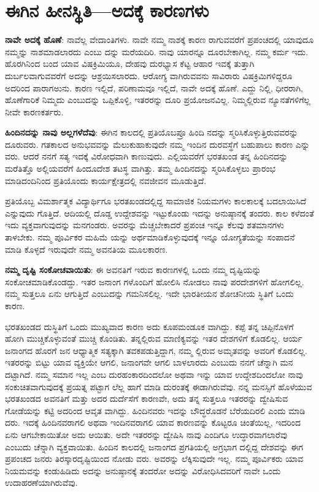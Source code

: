 
\chapter{ಈಗಿನ ಹೀನಸ್ಥಿತಿ—ಅದಕ್ಕೆ ಕಾರಣಗಳು}

\textbf{ನಾವೇ ಅದಕ್ಕೆ ಹೊಣೆ}: ನಾವೆಲ್ಲ ವೇದಾಂತಿಗಳು. ನಾವೇ ನಮ್ಮ ನಾಶಕ್ಕೆ ಕಾರಣ ರಾಗುವವರೆಗೆ ಪ್ರಪಂಚದಲ್ಲಿ ಯಾವುದೂ ನಮ್ಮನ್ನು ನಾಶಮಾಡಲಾರದು ಎಂಬು ದನ್ನು ಮರೆಯದಿರಿ. ನಾವು ಯಾರನ್ನೂ ದೂರಬೇಕಾಗಿಲ್ಲ. ನಮ್ಮ ಕರ್ಮ ಇದು. ಹೊರಗಿನಿಂದ ಬಂದ ಯಾವ ವಿಷಕ್ರಿಮಿಯೂ, ದೇಹವು ದುರಭ್ಯಾಸ ಕೆಟ್ಟ ಆಹಾರ ಇವಕ್ಕೆ ತುತ್ತಾಗಿ ದುರ್ಬಲವಾಗುವವರೆಗೆ ಅದನ್ನು ಆಶ್ರಯಿಸಲಾರದು. ಆರೋಗ್ಯ ವಾಗಿರುವವನು ಸಾವಿರಾರು ವಿಷಕ್ರಿಮಿಗಳಿದ್ದರೂ ಅದರಿಂದ ಪಾರಾಗಅುನು. ಕಾರಣ ಇಲ್ಲಿದೆ, ಪರಿಣಾಮವೂ ಇಲ್ಲಿದೆ, ನಾವೇ ಅದಕ್ಕೆ ಹೊಣೆ. ಎದ್ದು ನಿಲ್ಲಿ, ಧೀರರಾಗಿ, ಹೊಣೆಗಾರಿಕೆ ನಿಮ್ಮದು ಎಂಬುದನ್ನು ಒಪ್ಪಿಕೊಳ್ಳಿ, ಇತರರನ್ನು ದೂರಿ ಪ್ರಯೋಜನವಿಲ್ಲ. ನಿಮ್ಮಲ್ಲಿರುವ ನ್ಯೂನತೆಗಳಿಗೆಲ್ಲ ನೀವೇ ಕಾರಣಕರ್ತರು.

\textbf{ಹಿಂದಿನದನ್ನು ನಾವು ಅಲ್ಲಗಳೆದೆವು}: ಈಗಿನ ಕಾಲದಲ್ಲಿ ಪ್ರತಿಯೊಬಪ್ರೂ ಹಿಂದಿ ನದನ್ನು ಸ್ಮರಿಸಿಕೊಳ್ಳುತ್ತಿರುವವರನ್ನು ದೂರುವರು. ಗತಕಾಲದ ಅನುಭವವನ್ನು ಮೆಲುಕುಹಾಕುವುದೇ ನಮ್ಮ ಇಂದಿನ ದುರವಸ್ಥೆಗೆ ಬಹುಪಾಲು ಕಾರಣ ಎನ್ನು ವರು. ಆದರೆ ನನಗೆ ಸತ್ಯ ಇದಕ್ಕೆ ವಿರೋಧವಾಗಿ ಕಾಣುವುದು. ಎಲ್ಲಿಯವರೆಗೆ ಭರತಖಂಡ ತನ್ನ ಹಿಂದಿನದನ್ನು ಮರೆತಿತ್ತೊ ಅಲ್ಲಿಯವರೆಗೆ ಹಿಂದೂದೇಶ ತಟಸ್ಥ ವಾಗಿತ್ತು. ತಮ್ಮ ಹಿಂದಿನದನ್ನು ಸ್ಮರಿಸಿಕೊಳ್ಳಲು ಪ್ರಾರಂಭ ಮಾಡಿದಂದಿನಿಂದ ಪ್ರತಿಯೊಂದು ಕಾರ್ಯಕ್ಷೇತ್ರದಲ್ಲಿ ನವಜೀವನ ಮೂಡುತ್ತಿದೆ.

ಪ್ರತಿಯೊಬ್ಬ ವಿಮರ್ಶಾತ್ಮಕ ವಿದ್ಯಾರ್ಥಿಗೂ ಭರತಖಂಡದಲ್ಲಿದ್ದ ಸಾಮಾಜಿಕ ನಿಯಮಗಳು ಕಾಲಕಾಲಕ್ಕೆ ಬದಲಾಯಿಸಿದೆ ಎನ್ನುವುದು ಗೊತ್ತಿದೆ. ಆದಿಯಲ್ಲಿ ದೊಡ್ಡ ಉದ್ದೇಶವನ್ನು ಇಟ್ಟುಕೊಂಡು ಇದನ್ನು ಅನುಷ್ಠಾನಕ್ಕೆ ತಂದರು. ಕಾಲ ಕಳೆದಂತೆ ಇದು ವ್ಯಕ್ತವಾಗುವುದನ್ನು ಮನಗಂಡರು. ಅವರನ್ನು ಮೆಚ್ಚಬೇಕಾದರೆ ಪ್ರಪಂಚ ಇನ್ನೂ ಕೆಲವು ಶತಮಾನಗಳು ತಾಳಬೇಕು. ನಮ್ಮ ಪೂರ್ವಿಕರ ಮಹಿಮೆ ಯನ್ನು ಅರ್ಥಮಾಡಿಕೊಳ್ಳುವುದಕ್ಕೆ ಇನ್ನೂ ಯೋಗ್ಯತೆಯನ್ನು ಸಂಪಾದನೆ ಮಾಡಿ ಕೊಳ್ಳದೆ ಇರುವುದೇ ನಮ್ಮ ಅವನತಿಯ ಮೂಲಕಾರಣ.

\textbf{ನಮ್ಮ ದೃಷ್ಟಿ ಸಂಕೋಚವಾಯಿತು}: ಈ ಅವನತಿಗೆ ಇರುವ ಕಾರಣಗಳಲ್ಲಿ ಒಂದು ನಮ್ಮ ದೃಷ್ಟಿಯನ್ನು ಸಂಕೋಚಮಾಡಿಕೊಂಡದ್ದು. ಇತರ ಜನಾಂಗ ಗಳೊಂದಿಗೆ ಹೋಲಿಸಿ ನೋಡಲು ನಾವು ಪರದೇಶಗಳಿಗೆ ಹೋಗಲಿಲ್ಲ. ನಮ್ಮ ಸುತ್ತಲೂ ಏನು ಆಗುತ್ತಿದೆ ಎಂಬುದನ್ನು ಗಮನಿಸಲಿಲ್ಲ. ಇದೇ ಭಾರತೀಯನ ಶೋಚನೀಯ ಸ್ಥಿತಿಗೆ ಒಂದು ಕಾರಣ.

ಭರತಖಂಡದ ದುಸ್ಥಿತಿಗೆ ಒಂದು ಮುಖ್ಯವಾದ ಕಾರಣ ಅದು ಕೂಪಮಂಡೂಕ ವಾಗಿದ್ದು. ಕಪ್ಪೆ ತನ್ನ ಚಿಪ್ಪಿನೊಳಗೆ ಹೋಗಿ ಮುಚ್ಚಿಕೊಳ್ಳುವಂತೆ ಮುಚ್ಚಿ ಕೊಂಡಿತು. ತನ್ನಲ್ಲಿರುವ ಮಾಣಿಕ್ಯವನ್ನು ಇತರ ದೇಶಗಳಿಗೆ ಕೊಡಲಿಲ್ಲ. ಆರ್ಯ ಜನಾಂಗದ ಹೊರಗೆ ಜನ ಆಧ್ಯಾತ್ಮಿಕ ಸತ್ಯಕ್ಕಾಗಿ ತವಕಪಡುತ್ತಿದ್ದಾಗ, ನಮ್ಮ ಲ್ಲಿರುವ ಅಮೃತವನ್ನು ಅವರಿಗೆ ಕೊಡಲಿಲ್ಲ. ಇತರರನ್ನು ಬಿಟ್ಟು ಯಾವ ವ್ಯಕ್ತಿಯೇ ಆಗಲಿ, ಜನಾಂಗವೇ ಆಗಲಿ ಬಾಳಲಾರದು ಎಂಬುದು ನನಗೆ ಚೆನ್ನಾಗಿ ಮನ ದಟ್ಟಾಗಿದೆ. ನಮ್ಮ ಸಮಾನ ಇಲ್ಲ ಎಂಬ ದುರಹಂಕಾರದಿಂದಲೋ ಅಥವಾ ಇನ್ನು ಯಾವ ಉದ್ದೇಶದಿಂದಲೋ ನಾವು ಸಂಕುಚಿತವಾಗುವುದಕ್ಕೆ ಪ್ರಯತ್ನ ಪಟ್ಟಾಗ ಲೆಲ್ಲ ಹಾಗೆ ಮಾಡಿ ದುರಂತಕ್ಕೆ ಈಡಾಗಿರುವೆವು. ನನ್ನ ಮನಸ್ಸಿಗೆ ಹೊಳೆಯುವ ಭರತಖಂಡದ ಅವನತಿಗೆ ಮತ್ತು ಅದರ ದುರ್ದೆಸೆಗೆ ಕಾರಣವೇ, ಅದು ತನ್ನ ಸುತ್ತಲೂ ಇತರರನ್ನು ದ್ವೇಷಿಸುವ ಗೋಡೆಯನ್ನು ಕಟ್ಟಿ ಅದರಿಂದ ಆವೃತ ವಾಗಿದ್ದು. ಹಿಂದಿನವರು ಇದನ್ನು ಬೌದ್ಧರೊಡನೆ ಬೆರೆಯದಿರಲಿ ಎಂದು ಮಾಡಿ ದರು. ಇದಕ್ಕೆ ಹಿಂದಿನವರಾಗಲಿ ಅಥವಾ ಇಂದಿನವರಾಗಲಿ ಯಾವ ಕಾರಣವನ್ನು ಕೊಟ್ಟರೂ ಚಿಂತೆಯಿಲ್ಲ, ಇದರಿಂದ ಏನು ಆಗಬೇಕಾಯಿತೋ ಅದು ಆಯಿತು. ಅದೇ ಇತರರನ್ನು ದ್ವೇಷಿಸಿ ನಾವು ಎಂದಿಗೂ ಉದ್ಧಾರವಾಗಲಾರೆವು ಎಂಬುದು ಚೆನ್ನಾಗಿ ವ್ಯಕ್ತವಾಯಿತು. ಹಿಂದಿನ ಕಾಲದಲ್ಲಿ ಜನಾಂಗದ ಪ್ರಗತಿಯಲ್ಲಿ ಅಗ್ರಭಾಗ ದಲ್ಲಿದ್ದ ದೇಶವನ್ನು ಈಗ ಪ್ರಪಂಚದ ಜನರು ತಿರಸ್ಕಾರದೃಷ್ಟಿಯಿಂದ ನೋಡು ವರು. ಅವರನ್ನು ಲೆಕ್ಕಿಸುವುದೇ ಇಲ್ಲ. ನಮ್ಮ ಪೂರ್ವಿಕರು ಯಾವ ನಿಯಮವನ್ನು ಕಂಡುಹಿಡಿದು ಅದನ್ನು ಅನುಷ್ಠಾನಕ್ಕೆ ತಂದರೋ ಅದನ್ನು ವಿರೋಧಿಸಿದವರಿಗೆ ನಾವೇ ಒಂದು ಉದಾಹರಣೆಯಾಗಿರುವೆವು.

